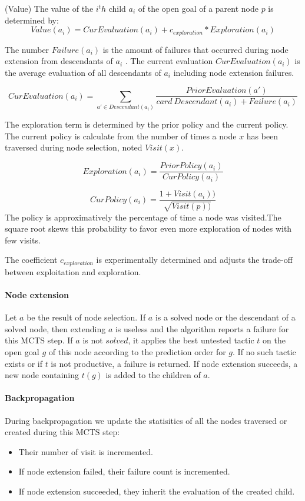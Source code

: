 \documentclass[runningheads,a4paper,draft]{svjour3}
\begin{document}
\begin{definition}\label{def:value}(Value)
The value of the $i^th$ child $a_i$ of the open goal of a parent node $p$ 
is determined by:
\[\mathit{Value}(a_i) = \mathit{CurEvaluation}(a_i) + c_{exploration} * 
\mathit{Exploration}(a_i)\]

The number $\mathit{Failure}(a_i)$ is the amount of failures that occurred 
during node extension from descendants of $a_i$ .
The current evaluation $CurEvaluation(a_i)$ is the average evaluation of
all descendants of $a_i$ including node extension failures.

\[\mathit{CurEvaluation}(a_i) =
  \sum_{a' \in Descendant(a_i)} \frac{\mathit{PriorEvaluation}(a')} {card\
  \mathit{Descendant}(a_i) + \mathit{Failure}(a_i)}\]


The exploration term is determined by the prior policy and the current policy.
The current policy is calculate from the number of times a node $x$ has been 
traversed during node selection, noted $\mathit{Visit}(x)$.

\[\mathit{Exploration}(a_i) = 
\frac{\mathit{PriorPolicy}(a_i)}{\mathit{CurPolicy}(a_i)}\]

\[\mathit{CurPolicy}(a_i) = \frac{1 + 
\mathit{Visit}(a_i))}{\sqrt{\mathit{Visit}(p))}}\]
The policy is approximatively the  percentage of time a node was visited.The
square root skews this probability to favor even more exploration of nodes with
few visits.

The coefficient $c_{exploration}$ is experimentally determined and adjusts the
trade-off between exploitation and exploration.
\end{definition}

\paragraph{Node extension}
Let $a$ be the result of node selection.
If $a$ is a solved node or the descendant of a solved node, then extending $a$ 
is useless and the algorithm reports a failure for this MCTS step. 
If $a$ is not $solved$, it applies the best untested tactic $t$ on the open 
goal $g$ of this
node according to the prediction order for $g$. If no such tactic exists or if
$t$ is not productive, a failure is returned.
If node extension succeeds, a new node containing $t(g)$ is added to the 
children of $a$.


\paragraph{Backpropagation}
During backpropagation we update the statisitics of all the nodes traversed or
created during this MCTS step:
\begin{itemize}
\item Their number of visit is incremented.
\item If node extension failed, their failure count is incremented.
\item If node extension succeeded, they inherit the evaluation of the created
child.
\end{itemize}
\end{document}
